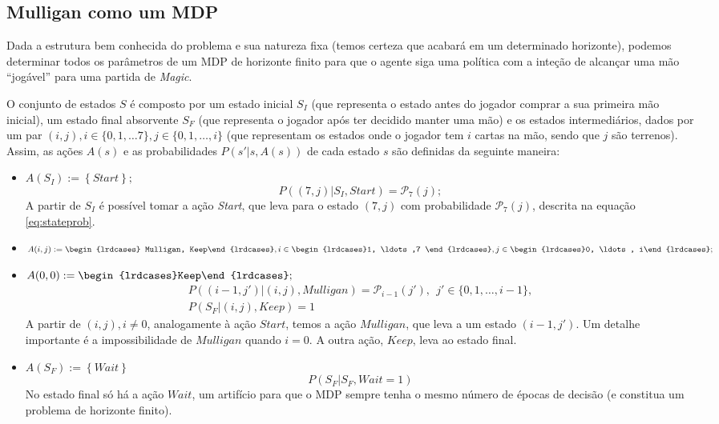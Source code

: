\documentclass[dvipsnames]{book}
\begin{document}
\newpage
\subsection{Mulligan como um MDP}

Dada a estrutura bem conhecida do problema e sua natureza fixa (temos certeza que acabará em um
determinado horizonte), podemos determinar todos os parâmetros de um MDP de horizonte finito para
que o agente siga uma política com a inteção de alcançar uma mão ``jogável'' para uma partida de
\textit{Magic}.

O conjunto de estados $S$ é composto por um estado inicial $S_I$ (que representa o estado antes
do jogador comprar a sua primeira mão inicial), um estado final absorvente $S_F$ (que representa
o jogador após ter decidido manter uma mão) e os estados intermediários, dados por um par $(i, j),
i \in \{ 0, 1, \ldots 7\}, j \in \{ 0, 1, \ldots, i \}$ (que representam os estados onde o jogador
tem $i$ cartas na mão, sendo que $j$ são terrenos). Assim, as ações $A(s)$ e as probabilidades
$P(s'|s, A(s))$ de cada estado $s$ são definidas da seguinte maneira:

\begin{itemize}
  \item $A(S_I) := \left\{ Start \right\};$
  \begin{equation*}
    P((7, j) | S_I, Start) =  \mathcal{P}_7(j);
  \end{equation*}
   A partir de $S_I$ é possível tomar a ação \textit{Start}, que leva para o estado $(7, j)$ com
   probabilidade $\mathcal{P}_7(j)$, descrita na equação \ref{eq:stateprob}.
  \item $A(i, j):= \begin{lrdcases} Mulligan, Keep\end{lrdcases}, i\in\begin{lrdcases}1, \ldots ,7 \end{lrdcases}, j \in \begin{lrdcases}0, \ldots, i\end{lrdcases};$
  \item $A(0, 0):=\begin{lrdcases}Keep\end{lrdcases};$
  \begin{gather*}
    P((i - 1, j')| (i, j), Mulligan) = \mathcal{P}_{i-1}(j'),\ \ j' \in \{0,1, \ldots, i-1\},\\
    P(S_F|(i, j), Keep) = 1
  \end{gather*}
   A partir de $(i, j), i \neq 0$, analogamente à ação $Start$, temos a ação $Mulligan$, que leva a um estado
   $(i -1, j')$. Um detalhe importante é a impossibilidade de $Mulligan$ quando $i = 0$. A outra ação,
   $Keep$, leva ao estado final.
   \item $A(S_F) := \left\{ Wait \right\}$
   \begin{equation*}
     P(S_F | S_F, Wait = 1)
   \end{equation*}
   No estado final só há a ação $Wait$, um artifício para que o MDP sempre tenha o mesmo número de
   épocas de decisão (e constitua um problema de horizonte finito).
\end{itemize}
\end{document}
